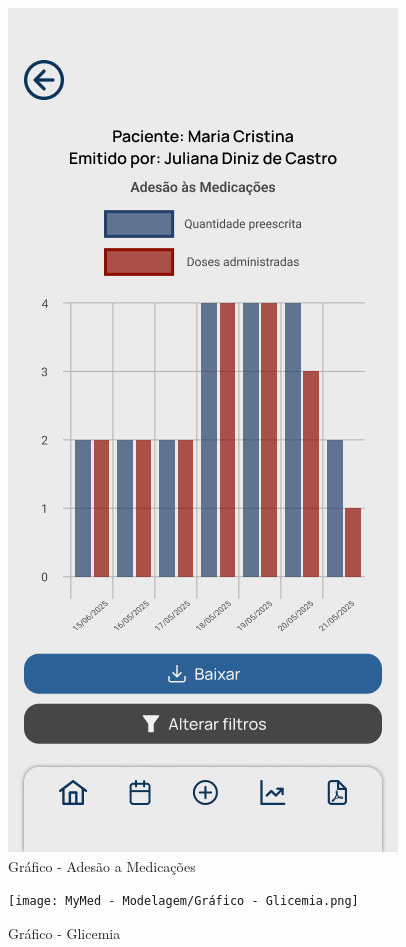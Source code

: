 \begin{figure}[!htbp]
	\centering
	\includegraphics[width=0.6\linewidth]{MyMed - Modelagem/Gráfico - Adesão a Medicações.png}
	\caption{Gráfico - Adesão a Medicações}
	\label{grafico_adesao_medicacoes}
\end{figure}

\begin{figure}[!htbp]
	\centering
	\texttt{[image: MyMed - Modelagem/Gráfico - Glicemia.png]}
	\caption{Gráfico - Glicemia}
	\label{grafico_glicemia}
\end{figure}

